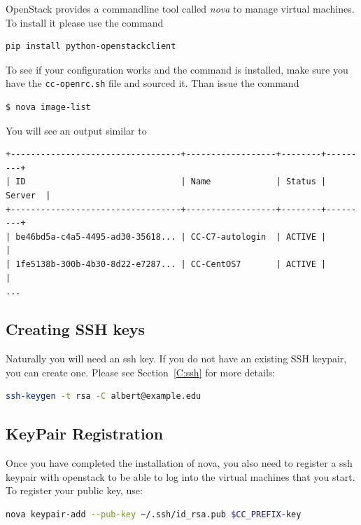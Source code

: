 OpenStack provides a commandline tool called \textit{nova} to manage
virtual machines. To install it please use the command

\begin{lstlisting}[language=bash]
pip install python-openstackclient
\end{lstlisting}

To see if your configuration works and the command is installed, make
sure you have the \verb|cc-openrc.sh| file and sourced it. Than issue
the command

\begin{lstlisting}[language=bash]
$ nova image-list
\end{lstlisting}

You will see an output similar to 

\begin{tiny}
\begin{lstlisting}
+----------------------------------+------------------+--------+---------+
| ID                               | Name             | Status | Server  |
+----------------------------------+------------------+--------+---------+
| be46bd5a-c4a5-4495-ad30-35618... | CC-C7-autologin  | ACTIVE |         |
| 1fe5138b-300b-4b30-8d22-e7287... | CC-CentOS7       | ACTIVE |         |
...
\end{lstlisting}
\end{tiny}

\subsection{Creating SSH keys}

Naturally you will need an ssh key.  If you do not have an existing
SSH keypair, you can create one. Please see Section~\ref{C:ssh} for
more details:

\begin{lstlisting}[language=bash]
ssh-keygen -t rsa -C albert@example.edu
\end{lstlisting}

\subsection{KeyPair Registration}

Once you have completed the installation of nova, you also need to
register a ssh keypair with openstack to be able to log into the
virtual machines that you start. To register your public key, use:

\begin{lstlisting}[language=bash]
nova keypair-add --pub-key ~/.ssh/id_rsa.pub $CC_PREFIX-key
\end{lstlisting}

